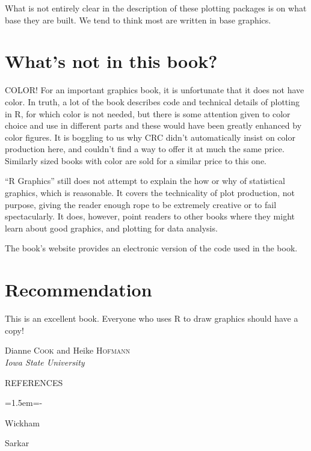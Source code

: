 \documentclass[12pt]{article}
\newenvironment{references}{
  \begin{center} \textsf{REFERENCES} \end{center}
  \begin{list}{}{\topsep=0pt\parsep=0pt\baselineskip=20pt
   \leftmargin=1.5em\itemindent=-\leftmargin}}
  {\end{list}}
\begin{document}
\noindent What is not entirely clear in the description of these plotting packages is on what base they are built. We tend to think  most are written in base graphics.

\section{What's not in this book?} 

COLOR! For an important graphics book, it is unfortunate that it does not
have color. In truth, a lot of the book describes code and technical
details of plotting in R, for which color is not needed, but there is some attention given to color choice and use in
different parts and these would have been greatly enhanced by color
figures. It is boggling to us why CRC didn't automatically insist on color
production here, and couldn't find a way to offer it at much the same
price. Similarly sized books with color are sold for a similar price
to this one.

``R Graphics'' still does not attempt to explain the how or why of
statistical graphics, which is reasonable.  It covers the technicality
of plot production, not purpose, giving the reader enough rope to be
extremely creative or to fail spectacularly. It does, however, point
readers to other books where they might learn about good graphics, and
plotting for data analysis.

The book's website provides an electronic version of
the code used in the book.

\section{Recommendation}

This is an excellent book. Everyone who uses R to draw graphics should have a copy! 

\begin{flushright}\def\baselinestretch{1}
Dianne \textsc{Cook} and Heike \textsc{Hofmann} \\ 
\emph{Iowa State University}
\end{flushright}

\begin{references} 
\item Wickham

\item Sarkar
\end{references}
\end{document}
